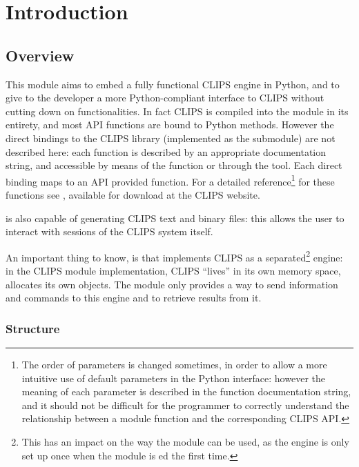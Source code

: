 \chapter{Introduction\label{introduction}}

\section{Overview\label{pyclips-overview}}

This module aims to embed a fully functional CLIPS engine in Python, and
to give to the developer a more Python-compliant interface to CLIPS
without cutting down on functionalities. In fact CLIPS is compiled into
the module in its entirety, and most API functions are bound to Python
methods. However the direct bindings to the CLIPS library (implemented
as the  submodule) are not described here: each function
is described by an appropriate documentation string, and accessible by
means of the  function or through the 
tool. Each direct binding maps to an API provided function. For a
detailed reference\footnote{The order of parameters is changed sometimes,
in order to allow a more intuitive use of default parameters in the
Python interface: however the meaning of each parameter is described
in the function documentation string, and it should not be difficult
for the programmer to correctly understand the relationship between a
module function and the corresponding CLIPS API.} for these functions
see \clipsapg{}, available for download at the CLIPS website.

\pyclips{} is also capable of generating CLIPS text and binary files:
this allows the user to interact with sessions of the CLIPS system
itself.

An important thing to know, is that \pyclips{} implements CLIPS as a
separated\footnote{This has an impact on the way the module can be used,
as the engine is only set up once when the module is ed the
first time.} engine: in the CLIPS module implementation, CLIPS
``lives'' in its own memory space, allocates its own objects. The module
only provides a way to send information and commands to this engine
and to retrieve results from it.


\subsection{Structure\label{pyclips-ov-structure}}

